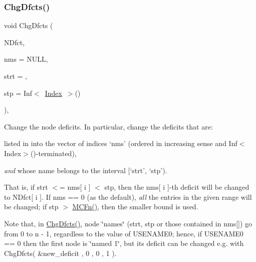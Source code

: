 \subsubsection{\texorpdfstring{Chg\+Dfcts()}{ChgDfcts()}}
{\footnotesize\ttfamily void Chg\+Dfcts (\begin{DoxyParamCaption}\item[{\mbox{\hyperlink{class_m_c_f_class_ad325f3193dbba0ddef1da4e72d29eda6}{c\+F\+Row}}}]{N\+Dfct,  }\item[{\mbox{\hyperlink{class_m_c_f_class_a81575b2d4e4d5636b17170432150ae69}{c\+Index\+\_\+\+Set}}}]{nms = {\ttfamily NULL},  }\item[{\mbox{\hyperlink{class_m_c_f_class_a76aaabb20535c51a2752b93f6c38fe54}{c\+Index}}}]{strt = {},  }\item[{\mbox{\hyperlink{class_m_c_f_class_ad53d6229d7ec28555a9c9c2fd9abf773}{Index}}}]{stp = {\ttfamily Inf$<$~\mbox{\hyperlink{class_m_c_f_class_ad53d6229d7ec28555a9c9c2fd9abf773}{Index}}~$>$()} }\end{DoxyParamCaption})\hspace{0.3cm}{\ttfamily [override]}, {\ttfamily [virtual]}}

Change the node deficits. In particular, change the deficits that are\+:


\begin{DoxyItemize}
\item listed in into the vector of indices `nms' (ordered in increasing sense and Inf$<$\+Index$>$()-\/terminated),
\item {\itshape and} whose name belongs to the interval \mbox{[}`strt', `stp').
\end{DoxyItemize}

That is, if strt $<$= nms\mbox{[} i \mbox{]} $<$ stp, then the nms\mbox{[} i \mbox{]}-\/th deficit will be changed to N\+Dfct\mbox{[} i \mbox{]}. If nms == 0 (as the default), {\itshape all} the entries in the given range will be changed; if stp $>$ \mbox{\hyperlink{class_m_c_f_class_a6438187f454e795c03a850bfab31be84}{M\+C\+Fn()}}, then the smaller bound is used.

Note that, in \mbox{\hyperlink{class_m_c_f_simplex_aa45a772ac26eddf9fa9e3f2991b71cc4}{Chg\+Dfcts()}}, node \char`\"{}names\char`\"{} (strt, stp or those contained in nms\mbox{[}\mbox{]}) go from 0 to n -\/ 1, regardless to the value of U\+S\+E\+N\+A\+M\+E0; hence, if U\+S\+E\+N\+A\+M\+E0 == 0 then the first node is \char`\"{}named 1\char`\"{}, but its deficit can be changed e.\+g. with Chg\+Dfcts( \&new\+\_\+deficit , 0 , 0 , 1 ).


